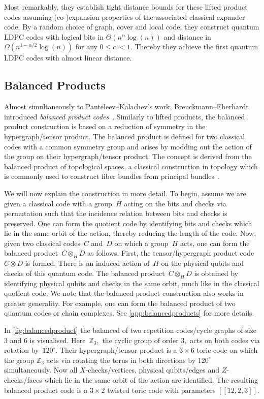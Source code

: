 \documentclass[amsmath, amssymb, floatfix, reprint, twocolumn, notitlepage, 10pt]{revtex4-1}
\newcommand{\change}{}
\begin{document}
%
Most remarkably, they establish tight distance bounds for these lifted product codes assuming (co-)expansion properties of the associated classical expander code.
By a random choice of graph, cover and local code, they construct quantum LDPC codes with logical bits in $\Theta(n^\alpha\log(n))$ and distance in  $\Omega(n^{1-\alpha/2}\log(n))$ for any $0\leq \alpha <1.$ 
Thereby they achieve the first quantum LDPC  codes with almost linear distance.


\subsection{Balanced Products}\label{sec:balanced_product}
Almost simultaneously to Panteleev--Kalachev's work, Breuckmann--Eberhardt  introduced \emph{balanced product codes}~\cite{breuckmann2020balanced}. 
Similarly to lifted products, the balanced product construction is based on a reduction of symmetry in the hypergraph/tensor product. 
The balanced product is defined for two classical codes with a common symmetry group and arises by modding out the action of the group on their hypergraph/tensor product. 
The concept is derived from the balanced product of topological spaces, a classical construction in topology which is commonly used to construct fiber bundles from principal bundles~\cite{nakahara2003geometry}. 

{\change We will now explain the construction in more detail.
To begin, assume we are given a classical code with a group~$H$ acting on the bits and checks via permutation such that the incidence relation between bits and checks is preserved.
One can form the quotient code by identifying bits and checks which lie in the same orbit of the action, thereby reducing the length of the code.
Now, given two classical codes~$C$ and~$D$ on which a group~$H$ acts, one can form the balanced product~$C\otimes_H D$ as follows.
First, the tensor/hypergraph product code~$C\otimes D$ is formed. There is an induced action of~$H$ on the physical qubits and checks of this quantum code. The balanced product~$C\otimes_H D$ is obtained by identifying physical qubits and checks in the same orbit, much like in the classical quotient code. We note that the balanced product construction also works in greater generality. For example, one can form the balanced product of two quantum codes or chain complexes. See \cref{app:balancedproducts} for more details.

In  \cref{fig:balancedproduct} the balanced of two repetition codes/cycle graphs of size $3$ and $6$ is visualised. 
Here~$\mathbb{Z}_3,$ the cyclic group of order $3,$ acts on both codes via rotation by~$120^\circ$. Their hypergraph/tensor product is a $3\times 6$ toric code on which the group $\mathbb{Z}_3$ acts via rotating the torus in both directions by $120^\circ$ simultaneously. 
Now all  $X$-checks/vertices, physical qubits/edges and $Z$-checks/faces which lie in the same orbit of the action are identified. The resulting balanced product code is a  $3\times 2$ twisted toric code with parameters $[[12,2,3]].$ 
}
\end{document}

